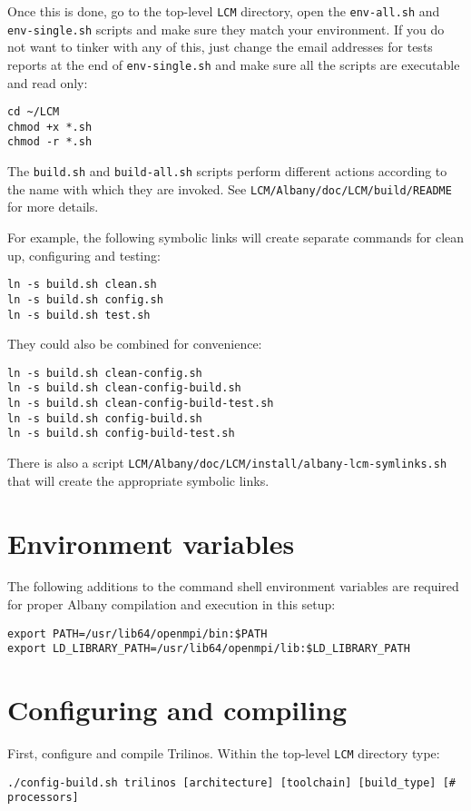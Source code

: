 \documentclass[10pt,a4paper]{article} \usepackage[utf8]{inputenc}
\begin{document}
Once this is done, go to the top-level \verb+LCM+ directory, open the
\verb+env-all.sh+ and \verb+env-single.sh+ scripts and make sure they
match your environment. If you do not want to tinker with any of this,
just change the email addresses for tests reports at the end of
\verb+env-single.sh+ and make sure all the scripts are executable and
read only:
\begin{verbatim}
cd ~/LCM
chmod +x *.sh
chmod -r *.sh
\end{verbatim}

The \verb+build.sh+ and \verb+build-all.sh+ scripts perform different
actions according to the name with which they are invoked. See
\verb+LCM/Albany/doc/LCM/build/README+ for more details. 

For example, the following symbolic links will create separate
commands for clean up, configuring and testing:
\begin{verbatim}
ln -s build.sh clean.sh
ln -s build.sh config.sh
ln -s build.sh test.sh
\end{verbatim}
They could also be combined for convenience:
\begin{verbatim}
ln -s build.sh clean-config.sh
ln -s build.sh clean-config-build.sh
ln -s build.sh clean-config-build-test.sh
ln -s build.sh config-build.sh
ln -s build.sh config-build-test.sh
\end{verbatim}
There is also a script
\verb+LCM/Albany/doc/LCM/install/albany-lcm-symlinks.sh+
that will create the appropriate symbolic links. 

\section{Environment variables}
The following additions to the command shell environment variables are
required for proper Albany compilation and execution in this setup:
\begin{verbatim}
export PATH=/usr/lib64/openmpi/bin:$PATH
export LD_LIBRARY_PATH=/usr/lib64/openmpi/lib:$LD_LIBRARY_PATH
\end{verbatim}

\section{Configuring and compiling}
First, configure and compile Trilinos. Within the top-level \verb+LCM+
directory type:
\begin{verbatim}
./config-build.sh trilinos [architecture] [toolchain] [build_type] [# processors]
\end{verbatim}
\end{document}
